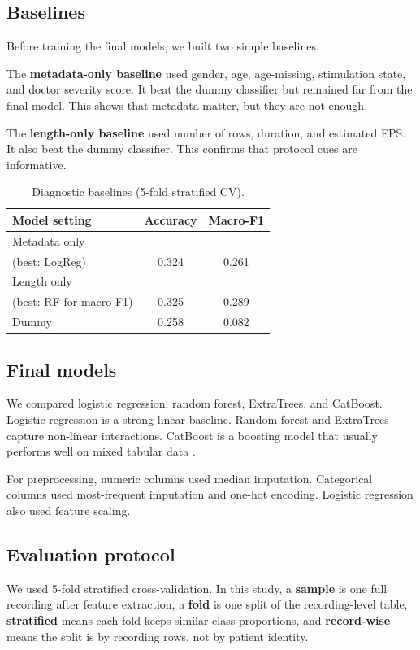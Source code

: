 \documentclass[10pt,twocolumn]{article}
\begin{document}
\subsection{Baselines}
Before training the final models, we built two simple baselines.

The \textbf{metadata-only baseline} used gender, age, age-missing, stimulation state, and doctor severity score. It beat the dummy classifier but remained far from the final model. This shows that metadata matter, but they are not enough.

The \textbf{length-only baseline} used number of rows, duration, and estimated FPS. It also beat the dummy classifier. This confirms that protocol cues are informative.

\begin{table}[H]
	\centering
	\caption{Diagnostic baselines (5-fold stratified CV).}
	\label{tab:baselines-short}
	\begin{tabular}{p{4cm}cc}
		\toprule
		Model setting & Accuracy & Macro-F1 \\
		\midrule
		Metadata only\\(best: LogReg) & 0.324 & 0.261 \\
		Length only\\(best: RF for macro-F1) & 0.325 & 0.289 \\
		Dummy & 0.258 & 0.082 \\
		\bottomrule
	\end{tabular}
\end{table}

\subsection{Final models}
We compared logistic regression, random forest, ExtraTrees, and CatBoost. Logistic regression is a strong linear baseline. Random forest and ExtraTrees capture non-linear interactions. CatBoost is a boosting model that usually performs well on mixed tabular data \citep{prokhorenkova2018}.

For preprocessing, numeric columns used median imputation. Categorical columns used most-frequent imputation and one-hot encoding. Logistic regression also used feature scaling.

\subsection{Evaluation protocol}
We used 5-fold stratified cross-validation. In this study, a \textbf{sample} is one full recording after feature extraction, a \textbf{fold} is one split of the recording-level table, \textbf{stratified} means each fold keeps similar class proportions, and \textbf{record-wise} means the split is by recording rows, not by patient identity.
\end{document}
